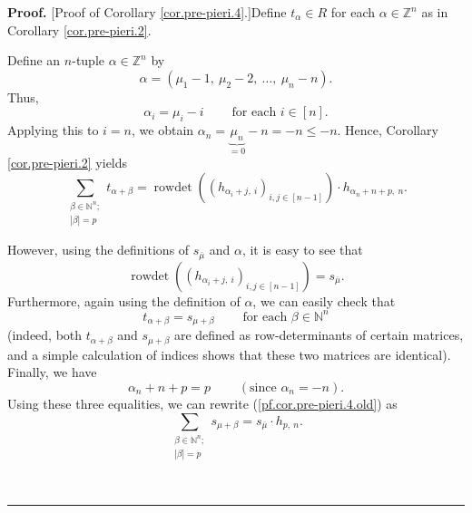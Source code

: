 \documentclass[numbers=enddot,12pt,final,onecolumn,notitlepage,english]{scrartcl}%
\theoremstyle{definition}
\newenvironment{proof}[1][Proof]{\noindent\textbf{#1.} }{\ \rule{0.5em}{0.5em}}
\let\sumnonlimits\sum
\renewcommand{\sum}{\sumnonlimits\limits}
\newenvironment{vershort}{}{}
\begin{document}
\begin{proof}
[Proof of Corollary \ref{cor.pre-pieri.4}.]Define $t_{\alpha}\in R$ for each
$\alpha\in\mathbb{Z}^{n}$ as in Corollary \ref{cor.pre-pieri.2}.

Define an $n$-tuple $\alpha\in\mathbb{Z}^{n}$ by%
\[
\alpha=\left(  \mu_{1}-1,\ \mu_{2}-2,\ \ldots,\ \mu_{n}-n\right)  .
\]
Thus,%
\begin{equation}
\alpha_{i}=\mu_{i}-i\ \ \ \ \ \ \ \ \ \ \text{for each }i\in\left[  n\right]
. \label{pf.cor.pre-pieri.4.ali=}%
\end{equation}
Applying this to $i=n$, we obtain $\alpha_{n}=\underbrace{\mu_{n}}%
_{=0}-n=-n\leq-n$. Hence, Corollary \ref{cor.pre-pieri.2} yields
\begin{equation}
\sum_{\substack{\beta\in\mathbb{N}^{n};\\\left\vert \beta\right\vert
=p}}t_{\alpha+\beta}=\operatorname*{rowdet}\left(  \left(  h_{\alpha
_{i}+j,\ i}\right)  _{i,j\in\left[  n-1\right]  }\right)  \cdot h_{\alpha
_{n}+n+p,\ n}. \label{pf.cor.pre-pieri.4.old}%
\end{equation}


\begin{vershort}
However, using the definitions of $s_{\overline{\mu}}$ and $\alpha$, it is
easy to see that%
\[
\operatorname*{rowdet}\left(  \left(  h_{\alpha_{i}+j,\ i}\right)
_{i,j\in\left[  n-1\right]  }\right)  =s_{\overline{\mu}}.
\]
Furthermore, again using the definition of $\alpha$, we can easily check that%
\[
t_{\alpha+\beta}=s_{\mu+\beta}\ \ \ \ \ \ \ \ \ \ \text{for each }\beta
\in\mathbb{N}^{n}%
\]
(indeed, both $t_{\alpha+\beta}$ and $s_{\mu+\beta}$ are defined as
row-determinants of certain matrices, and a simple calculation of indices
shows that these two matrices are identical). Finally, we have
\[
\alpha_{n}+n+p=p\ \ \ \ \ \ \ \ \ \ \left(  \text{since }\alpha_{n}=-n\right)
.
\]
Using these three equalities, we can rewrite (\ref{pf.cor.pre-pieri.4.old}) as%
\[
\sum_{\substack{\beta\in\mathbb{N}^{n};\\\left\vert \beta\right\vert
=p}}s_{\mu+\beta}=s_{\overline{\mu}}\cdot h_{p,\ n}.
\]

\end{vershort}


\end{proof}
\end{document}
